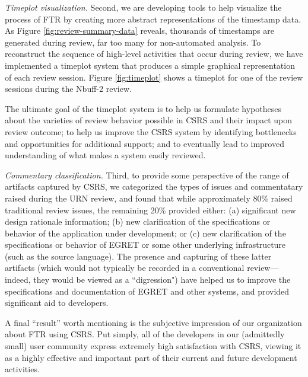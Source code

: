 {\sl Timeplot visualization.} Second, we are developing tools to help
visualize the process of FTR by creating more abstract representations of
the timestamp data.  As Figure \ref{fig:review-summary-data} reveals,
thousands of timestamps are generated during review, far too many for
non-automated analysis. To reconstruct the sequence of high-level
activities that occur during review, we have implemented a timeplot system
that produces a simple graphical representation of each review session.
Figure \ref{fig:timeplot} shows a timeplot for one of the review sessions
during the Nbuff-2 review.

The ultimate goal of the timeplot system is to help us formulate hypotheses
about the varieties of review behavior possible in CSRS and their impact
upon review outcome; to help us improve the CSRS system by identifying
bottlenecks and opportunities for additional support; and to eventually
lead to improved understanding of what makes a system easily reviewed.

{\sl Commentary classification.}
Third, to provide some perspective of the range of artifacts captured by
CSRS, we categorized the types of issues and commentatary raised during the
URN review, and found that while approximately 80\% raised traditional
review issues, the remaining 20\% provided either: (a) significant new
design rationale information; (b) new clarification of the specifications
or behavior of the application under development; or (c) new clarification
of the specifications or behavior of EGRET or some other underlying
infrastructure (such as the source language).  The presence and capturing
of these latter artifacts (which would not typically be recorded in a
conventional review---indeed, they would be viewed as a ``digression") have
helped us to improve the specifications and documentation of EGRET and
other systems, and provided significant aid to developers.

A final ``result'' worth mentioning is the subjective impression of our
organization about FTR using CSRS.  Put simply, all of the developers in
our (admittedly small) user community express extremely high satisfaction
with CSRS, viewing it as a highly effective and important part of their
current and future development activities.


